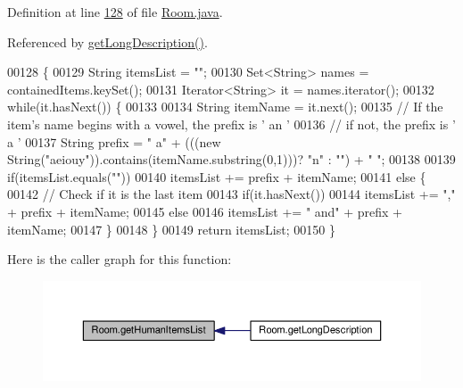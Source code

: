 Definition at line \hyperlink{Room_8java_source_l00128}{128} of file \hyperlink{Room_8java_source}{Room.\-java}.



Referenced by \hyperlink{Room_8java_source_l00118}{get\-Long\-Description()}.


\begin{DoxyCode}
00128                                       \{
00129         String itemsList = \textcolor{stringliteral}{""};
00130         Set<String> names = containedItems.keySet();
00131         Iterator<String> it = names.iterator();
00132         \textcolor{keywordflow}{while}(it.hasNext()) \{
00133 
00134             String itemName = it.next();
00135             \textcolor{comment}{// If the item's name begins with a vowel, the prefix is ' an '}
00136             \textcolor{comment}{// if not, the prefix is ' a '}
00137             String prefix = \textcolor{stringliteral}{" a"} + (((\textcolor{keyword}{new} String(\textcolor{stringliteral}{"aeiouy"})).contains(itemName.substring(0,1)))? \textcolor{stringliteral}{"n"} : \textcolor{stringliteral}{""}) +
       \textcolor{stringliteral}{" "};
00138 
00139             \textcolor{keywordflow}{if}(itemsList.equals(\textcolor{stringliteral}{""}))
00140                 itemsList += prefix + itemName;
00141             \textcolor{keywordflow}{else} \{
00142                 \textcolor{comment}{// Check if it is the last item}
00143                 \textcolor{keywordflow}{if}(it.hasNext())
00144                     itemsList += \textcolor{stringliteral}{","} + prefix + itemName;
00145                 \textcolor{keywordflow}{else}
00146                     itemsList += \textcolor{stringliteral}{" and"} + prefix + itemName;
00147             \}
00148         \}
00149         \textcolor{keywordflow}{return} itemsList;
00150     \}
\end{DoxyCode}


Here is the caller graph for this function\-:
\nopagebreak
\begin{figure}[H]
\begin{center}
\leavevmode
\includegraphics[width=350pt]{classRoom_ab8a87ad306f77a936873094b479bcde8_icgraph}
\end{center}
\end{figure}


